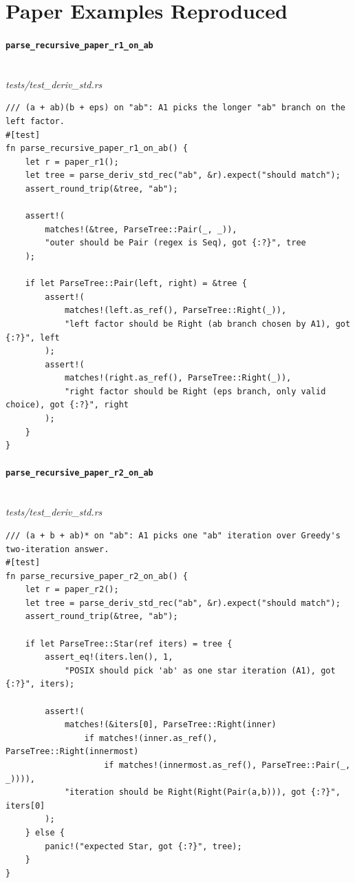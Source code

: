 \section{Paper Examples Reproduced}
\label{app:tests-paper-examples}

\paragraph{\texttt{parse\_recursive\_paper\_r1\_on\_ab}}\ \\[-0.4em]
\textit{\small tests/test\_deriv\_std.rs}
{\scriptsize\begin{verbatim}
/// (a + ab)(b + eps) on "ab": A1 picks the longer "ab" branch on the left factor.
#[test]
fn parse_recursive_paper_r1_on_ab() {
    let r = paper_r1();
    let tree = parse_deriv_std_rec("ab", &r).expect("should match");
    assert_round_trip(&tree, "ab");

    assert!(
        matches!(&tree, ParseTree::Pair(_, _)),
        "outer should be Pair (regex is Seq), got {:?}", tree
    );

    if let ParseTree::Pair(left, right) = &tree {
        assert!(
            matches!(left.as_ref(), ParseTree::Right(_)),
            "left factor should be Right (ab branch chosen by A1), got {:?}", left
        );
        assert!(
            matches!(right.as_ref(), ParseTree::Right(_)),
            "right factor should be Right (eps branch, only valid choice), got {:?}", right
        );
    }
}
\end{verbatim}}

\paragraph{\texttt{parse\_recursive\_paper\_r2\_on\_ab}}\ \\[-0.4em]
\textit{\small tests/test\_deriv\_std.rs}
{\scriptsize\begin{verbatim}
/// (a + b + ab)* on "ab": A1 picks one "ab" iteration over Greedy's two-iteration answer.
#[test]
fn parse_recursive_paper_r2_on_ab() {
    let r = paper_r2();
    let tree = parse_deriv_std_rec("ab", &r).expect("should match");
    assert_round_trip(&tree, "ab");

    if let ParseTree::Star(ref iters) = tree {
        assert_eq!(iters.len(), 1,
            "POSIX should pick 'ab' as one star iteration (A1), got {:?}", iters);

        assert!(
            matches!(&iters[0], ParseTree::Right(inner)
                if matches!(inner.as_ref(), ParseTree::Right(innermost)
                    if matches!(innermost.as_ref(), ParseTree::Pair(_, _)))),
            "iteration should be Right(Right(Pair(a,b))), got {:?}", iters[0]
        );
    } else {
        panic!("expected Star, got {:?}", tree);
    }
}
\end{verbatim}}

